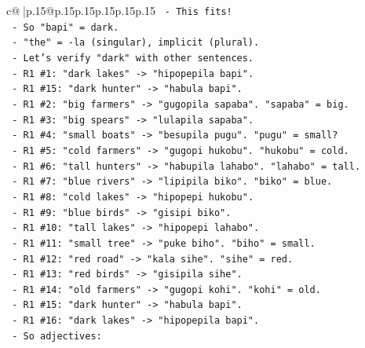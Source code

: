 \documentclass{article}
\begin{document}
{\begin{supertabular}{c@{$\;$}|p{.15\linewidth}@{}p{.15\linewidth}p{.15\linewidth}p{.15\linewidth}p{.15\linewidth}p{.15\linewidth}}
{{{\texttt{                  {-} This fits!} \\
\texttt{                  {-} So "bapi" = dark.} \\
\texttt{                  {-} "the" = {-}la (singular), implicit (plural).} \\
\texttt{                  {-} Let's verify "dark" with other sentences.} \\
\texttt{                  {-} R1 \#1: "dark lakes" {-}> "hipopepila bapi".} \\
\texttt{                  {-} R1 \#15: "dark hunter" {-}> "habula bapi".} \\
\texttt{                  {-} R1 \#2: "big farmers" {-}> "gugopila sapaba". "sapaba" = big.} \\
\texttt{                  {-} R1 \#3: "big spears" {-}> "lulapila sapaba".} \\
\texttt{                  {-} R1 \#4: "small boats" {-}> "besupila pugu". "pugu" = small?} \\
\texttt{                  {-} R1 \#5: "cold farmers" {-}> "gugopi hukobu". "hukobu" = cold.} \\
\texttt{                  {-} R1 \#6: "tall hunters" {-}> "habupila lahabo". "lahabo" = tall.} \\
\texttt{                  {-} R1 \#7: "blue rivers" {-}> "lipipila biko". "biko" = blue.} \\
\texttt{                  {-} R1 \#8: "cold lakes" {-}> "hipopepi hukobu".} \\
\texttt{                  {-} R1 \#9: "blue birds" {-}> "gisipi biko".} \\
\texttt{                  {-} R1 \#10: "tall lakes" {-}> "hipopepi lahabo".} \\
\texttt{                  {-} R1 \#11: "small tree" {-}> "puke biho". "biho" = small.} \\
\texttt{                  {-} R1 \#12: "red road" {-}> "kala sihe". "sihe" = red.} \\
\texttt{                  {-} R1 \#13: "red birds" {-}> "gisipila sihe".} \\
\texttt{                  {-} R1 \#14: "old farmers" {-}> "gugopi kohi". "kohi" = old.} \\
\texttt{                  {-} R1 \#15: "dark hunter" {-}> "habula bapi".} \\
\texttt{                  {-} R1 \#16: "dark lakes" {-}> "hipopepila bapi".} \\
\texttt{                  {-} So adjectives:} \\
}}}
\end{supertabular}}
\end{document}
